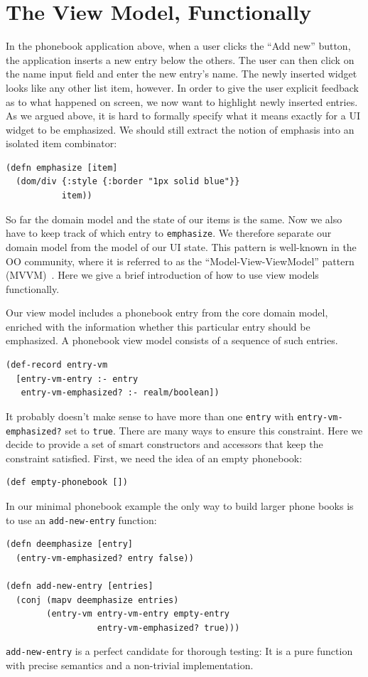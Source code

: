 \documentclass[sigplan,review,screen]{acmart}
\begin{document}
\section{The View Model, Functionally}

In the phonebook application above, when a user clicks the ``Add
new'' button, the application inserts a new entry below the others. The user can
then click on the name input field and enter the new entry's name. The
newly inserted widget looks like any other list item, however. In
order to give the user explicit feedback as to what happened on
screen, we now want to highlight newly inserted entries. As we argued
above, it is hard to formally specify what it means exactly for a UI
widget to be emphasized. We should still extract the notion of
emphasis into an isolated item combinator:
%
\begin{verbatim}
(defn emphasize [item]
  (dom/div {:style {:border "1px solid blue"}}
           item))
\end{verbatim}
%
So far the domain model and the state of our items is the same. Now
we also have to keep track of which entry to \texttt{emphasize}. We
therefore separate our domain model from the model of our UI state. This
pattern is well-known in the OO community, where it is referred to as
the ``Model-View-ViewModel'' pattern (MVVM)~\cite{MVVM}. Here we give a brief
introduction of how to use view models functionally.

Our view model includes a phonebook entry from the core domain model,
enriched with the information whether this particular entry should be
emphasized. A phonebook view model consists of a sequence of such
entries.
%
\begin{verbatim}
(def-record entry-vm
  [entry-vm-entry :- entry
   entry-vm-emphasized? :- realm/boolean])
\end{verbatim}
%
It probably doesn't make sense to have more than one \texttt{entry} with
\texttt{entry-vm-emphasized?} set to \texttt{true}. There are many ways to
ensure this constraint. Here we decide to provide a set of smart
constructors and accessors that keep the constraint satisfied. First,
we need the idea of an empty phonebook:
%
\begin{verbatim}
(def empty-phonebook [])
\end{verbatim}
%
In our minimal phonebook example the only way to build larger phone
books is to use an \texttt{add-new-entry} function:
%
\begin{verbatim}
(defn deemphasize [entry]
  (entry-vm-emphasized? entry false))

(defn add-new-entry [entries]
  (conj (mapv deemphasize entries)
        (entry-vm entry-vm-entry empty-entry
                  entry-vm-emphasized? true)))
\end{verbatim}
%
\texttt{add-new-entry} is a perfect candidate for thorough
testing: It is a pure function with precise semantics and a
non-trivial implementation.
\end{document}
